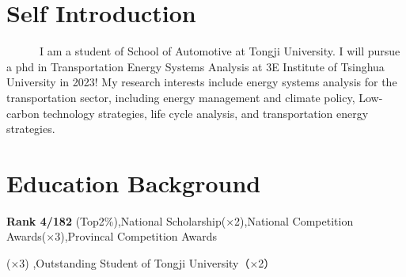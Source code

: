 \documentclass{resume}
\begin{document}


 
\section{Self Introduction}
 \ \ \  \ \ \ I am a student of School of Automotive at Tongji University. I will pursue a phd in Transportation Energy Systems Analysis at 3E Institute of Tsinghua University in 2023! My research interests include energy systems analysis for the transportation sector, including energy management and climate policy, Low-carbon technology strategies, life cycle analysis, and transportation energy strategies.

\section{Education Background}

\textbf{Rank 4/182 }(Top2\%),National Scholarship(×2),National Competition Awards(×3),Provincal Competition Awards  \par(×3)  ,Outstanding Student of Tongji University（×2）



\end{document}

